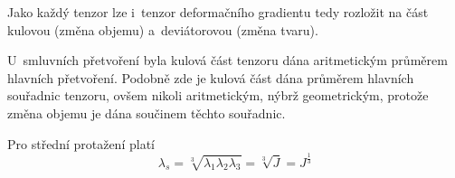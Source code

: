 Jako každý tenzor lze i~tenzor deformačního gradientu tedy rozložit na část kulovou (změna objemu) a~deviátorovou (změna tvaru). 

U~smluvních přetvoření byla kulová část tenzoru dána aritmetickým průměrem hlavních přetvoření. Podobně zde je kulová část dána průměrem hlavních souřadnic tenzoru, ovšem nikoli aritmetickým, nýbrž geometrickým, protože změna objemu je dána součinem těchto souřadnic.

Pro střední protažení platí
\begin{equation}
	\lambda_s
	= \sqrt[3]{\lambda_1 \lambda_2 \lambda_3}
	= \sqrt[3]{J}
	= J^{\frac{1}{3}}
\end{equation}
